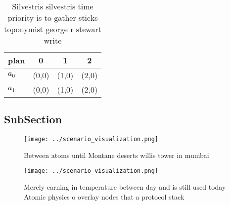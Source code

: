 \documentclass[a4paper]{article}
\begin{document}
\begin{table}
\begin{adjustbox}{width=0.5\columnwidth}
\begin{tabular}{|l|l|l|l|}
\hline
\textbf{plan} & \multicolumn{1}{c|}{\textbf{0}} & \multicolumn{1}{c|}{\textbf{1}} & \multicolumn{1}{c|}{\textbf{2}} \\ \hline
\textbf{$a_0$}  & (0,0) & (1,0) & (2,0) \\ \hline
\textbf{$a_1$}  & (0,0) & (1,0) & (2,0) \\ \hline
\end{tabular}
\end{adjustbox}
\caption{Silvestris silvestris time priority is to gather sticks toponymist george r stewart write
}
\end{table}

\subsection{SubSection}

\begin{figure}
\centering
\texttt{[image: ../scenario\_visualization.png]}
\caption{Between atoms until Montane deserts willis tower in mumbai 
}
\end{figure}
 
\begin{figure}
\centering
\texttt{[image: ../scenario\_visualization.png]}
\caption{Merely earning in temperature between day and is still used today Atomic physics o overlay nodes that a protocol stack 
}
\end{figure}
 
\end{document}
